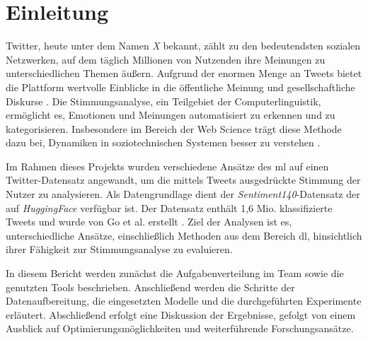 \section{Einleitung}\label{sec:einleitung}

Twitter, heute unter dem Namen \textit{X} bekannt, zählt zu den bedeutendsten sozialen Netzwerken, auf dem täglich Millionen von Nutzenden ihre Meinungen zu unterschiedlichen Themen äußern.
Aufgrund der enormen Menge an Tweets bietet die Plattform wertvolle Einblicke in die öffentliche Meinung und gesellschaftliche Diskurse \cite{pak2010twitter}.
Die Stimmungsanalyse, ein Teilgebiet der Computerlinguistik, ermöglicht es, Emotionen und Meinungen automatisiert zu erkennen und zu kategorisieren.
Insbesondere im Bereich der Web Science trägt diese Methode dazu bei, Dynamiken in soziotechnischen Systemen besser zu verstehen \cite{berners2006web, liu2012sentiment}.

Im Rahmen dieses Projekts wurden verschiedene Ansätze des \gls{ml} auf einen Twitter-Datensatz angewandt, um die mittels Tweets ausgedrückte Stimmung der Nutzer zu analysieren.
Als Datengrundlage dient der \textit{Sentiment140}-Datensatz der auf \textit{HuggingFace} \cite{sentiment1402023huggingface} verfügbar ist.
Der Datensatz enthält 1,6 Mio. klassifizierte Tweets und wurde von Go et al. erstellt \cite{go2009twitter}.
Ziel der Analysen ist es, unterschiedliche Ansätze, einschließlich Methoden aus dem Bereich \gls{dl}, hinsichtlich ihrer Fähigkeit zur Stimmungsanalyse zu evaluieren.

In diesem Bericht werden zunächst die Aufgabenverteilung im Team sowie die genutzten Tools beschrieben.
Anschließend werden die Schritte der Datenaufbereitung, die eingesetzten Modelle und die durchgeführten Experimente erläutert.
Abschließend erfolgt eine Diskussion der Ergebnisse, gefolgt von einem Ausblick auf Optimierungsmöglichkeiten und weiterführende Forschungsansätze.
